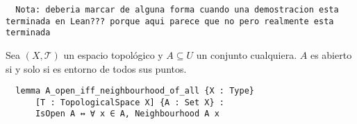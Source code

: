 \begin{lstlisting}
  Nota: deberia marcar de alguna forma cuando una demostracion esta terminada en Lean??? porque aqui parece que no pero realmente esta terminada
\end{lstlisting}

\begin{proposition}\label{caracterizacion-abierto}
  Sea $(X, \mathcal{T})$ un espacio topológico y $A \subseteq U$ un conjunto cualquiera. $A$ es abierto si y solo si es entorno de todos sus puntos.
\end{proposition}

\begin{lstlisting}
  lemma A_open_iff_neighbourhood_of_all {X : Type}
      [T : TopologicalSpace X] {A : Set X} :
      IsOpen A ↔ ∀ x ∈ A, Neighbourhood A x
\end{lstlisting}

